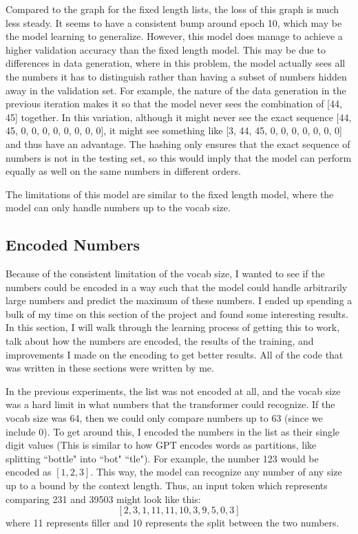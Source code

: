 \documentclass{article}
\begin{document}
Compared to the graph for the fixed length lists, the loss of this graph is much less steady. It seems to have a consistent bump around epoch 10, which may be the model learning to generalize. However, this model does manage to achieve a higher validation accuracy than the fixed length model. This may be due to differences in data generation, where in this problem, the model actually sees all the numbers it has to distinguish rather than having a subset of numbers hidden away in the validation set. For example, the nature of the data generation in the previous iteration makes it so that the model never sees the combination of [44, 45] together. In this variation, although it might never see the exact sequence [44, 45, 0, 0, 0, 0, 0, 0, 0, 0], it might see something like [3, 44, 45, 0, 0, 0, 0, 0, 0, 0] and thus have an advantage. The hashing only ensures that the exact sequence of numbers is not in the testing set, so this would imply that the model can perform equally as well on the same numbers in different orders. 

The limitations of this model are similar to the fixed length model, where the model can only handle numbers up to the vocab size.


\subsection{Encoded Numbers}
Because of the consistent limitation of the vocab size, I wanted to see if the numbers could be encoded in a way such that the model could handle arbitrarily large numbers and predict the maximum of these numbers. I ended up spending a bulk of my time on this section of the project and found some interesting results. In this section, I will walk through the learning process of getting this to work, talk about how the numbers are encoded, the results of the training, and improvements I made on the encoding to get better results. All of the code that was written in these sections were written by me.

In the previous experiments, the list was not encoded at all, and the vocab size was a hard limit in what numbers that the transformer could recognize. If the vocab size was 64, then we could only compare numbers up to 63 (since we include 0). To get around this, I encoded the numbers in the list as their single digit values (This is similar to how GPT encodes words as partitions, like splitting ``bottle" into ``bot" ``tle"). For example, the number 123 would be encoded as $[1, 2, 3]$. This way, the model can recognize any number of any size up to a bound by the context length. Thus, an input token which represents comparing 231 and 39503 might look like this:
$$
[2, 3, 1, 11, 11, 10, 3, 9, 5, 0, 3]
$$
where 11 represents filler and 10 represents the split between the two numbers. 
\end{document}
